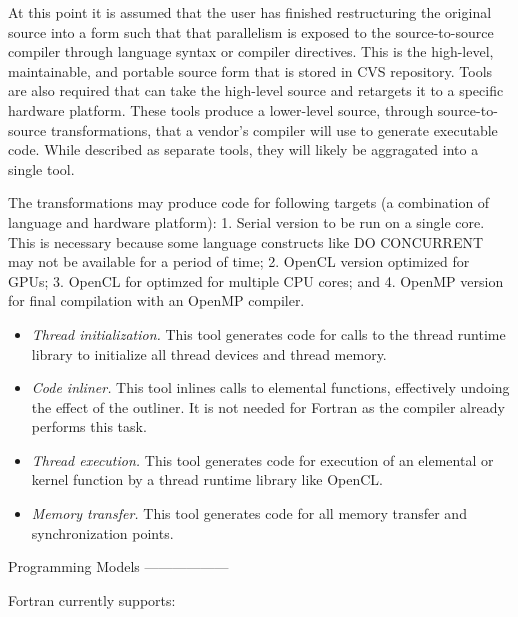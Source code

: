 At this point it is assumed that the user has finished restructuring the
original source into a form such that that parallelism is exposed to the
source-to-source compiler through language syntax or compiler directives.  This
is the high-level, maintainable, and portable source form that is stored in CVS
repository.  Tools are also required that can take the high-level source and
retargets it to a specific hardware platform.  These tools produce a lower-level
source, through source-to-source transformations, that a vendor's compiler will
use to generate executable code.  While described as separate tools, they will
likely be aggragated into a single tool.

The transformations may produce code for following targets (a combination of
language and hardware platform): 1. Serial version to be run on a single core.
This is necessary because some language constructs like DO CONCURRENT may not be
available for a period of time; 2. OpenCL version optimized for GPUs; 3. OpenCL
for optimzed for multiple CPU cores; and 4. OpenMP version for final compilation
with an OpenMP compiler.


\begin{itemize}

\item \emph{Thread initialization.} This tool generates code for calls to the
thread runtime library to initialize all thread devices and thread memory.

\item \emph{Code inliner.} This tool inlines calls to elemental functions,
effectively undoing the effect of the outliner. It is not needed for Fortran as
the compiler already performs this task.

\item \emph{Thread execution.} This tool generates code for execution of an
elemental or kernel function by a thread runtime library like OpenCL.

\item \emph{Memory transfer.}  This tool generates code for all memory transfer
and synchronization points.

\end{itemize}


Programming Models
------------------









Fortran currently supports:

